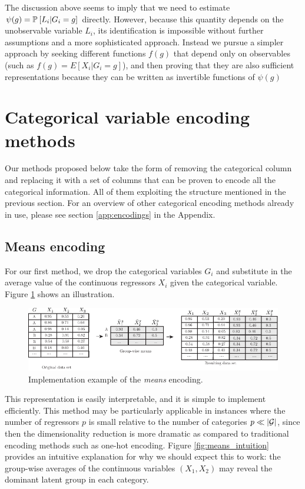 \documentclass{article}
\theoremstyle{plain}
\theoremstyle{definition}
\theoremstyle{remark}
\begin{document}
The discussion above seems to imply that we need to estimate $\psi(g) = \mathbb{P}_{}\left[ L_{i} | G_{i} = g\right]$ directly. However, because this quantity depends on the unobservable variable $L_{i}$, its identification is impossible without further assumptions and a more sophisticated approach. Instead we pursue a simpler approach by seeking different functions $f(g)$ that depend only on observables (such as $f(g) = E[X_{i} | G_{i} = g]$), and then proving that they are also sufficient representations because they can be written as invertible functions of $\psi(g)$


\section{Categorical variable encoding methods}
\label{sec:categorical_encoding}

Our methods proposed below take the form of removing the categorical column and replacing it with a set of columns that can be proven to encode all the categorical information. All of them exploiting the structure mentioned in the previous section. For an overview of other categorical encoding methods already in use, please see section \ref{app:encodings} in the Appendix.


\subsection{Means encoding}
\label{subsec:means}

For our first method, we drop the categorical variables $G_{i}$ and substitute in the average value of the continuous regressors $X_{i}$ given the categorical variable. Figure \ref{fig:means_encoding} shows an illustration.


\begin{figure}[H]
  \centering
  \includegraphics[width=\textwidth]{figures/means_encoding.pdf}
  \caption{Implementation example of the \emph{means} encoding.}
  \label{fig:means_encoding}
\end{figure}

This representation is easily interpretable, and it is simple to implement efficiently. This method may be particularly applicable in instances where the number of regressors $p$ is small relative to the number of categories $p \ll |\mathcal{G}|$, since then the dimensionality reduction is more dramatic as compared to traditional encoding methods such as one-hot encoding.
Figure \ref{fig:means_intuition} provides an intuitive explanation for why we should expect this to work: the group-wise averages of the continuous variables $(X_{1}, {X_{2}})$ may reveal the dominant latent group in each category.
\end{document}
